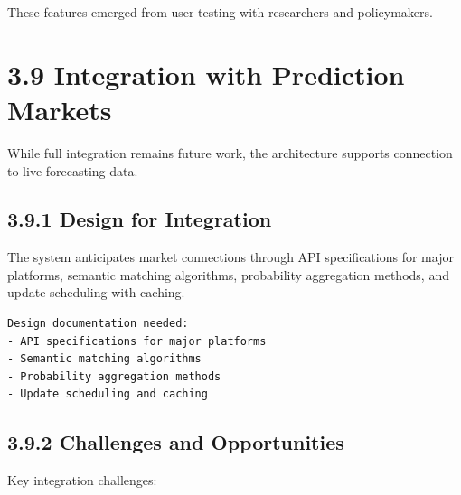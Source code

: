 \documentclass[
  11pt,
  letterpaper,
]{book}
\begin{document}
These features emerged from user testing with researchers and
policymakers.

\section*{3.9 Integration with Prediction
Markets}\label{sec-market-integration}


While full integration remains future work, the architecture supports
connection to live forecasting data.

\subsection*{3.9.1 Design for Integration}\label{sec-integration-design}

\begin{tcolorbox}[enhanced jigsaw, opacityback=0, leftrule=.75mm, breakable, coltitle=black, colbacktitle=quarto-callout-note-color!10!white, bottomrule=.15mm, rightrule=.15mm, toprule=.15mm, left=2mm, bottomtitle=1mm, arc=.35mm, toptitle=1mm, titlerule=0mm, title=\textcolor{quarto-callout-note-color}{\faInfo}\hspace{0.5em}{Integration Architecture}, opacitybacktitle=0.6, colframe=quarto-callout-note-color-frame, colback=white]

The system anticipates market connections through API specifications for
major platforms, semantic matching algorithms, probability aggregation
methods, and update scheduling with caching.

\end{tcolorbox}

\begin{verbatim}
Design documentation needed:
- API specifications for major platforms
- Semantic matching algorithms
- Probability aggregation methods
- Update scheduling and caching
\end{verbatim}

\subsection*{3.9.2 Challenges and
Opportunities}\label{sec-market-challenges}

Key integration challenges:
\end{document}
